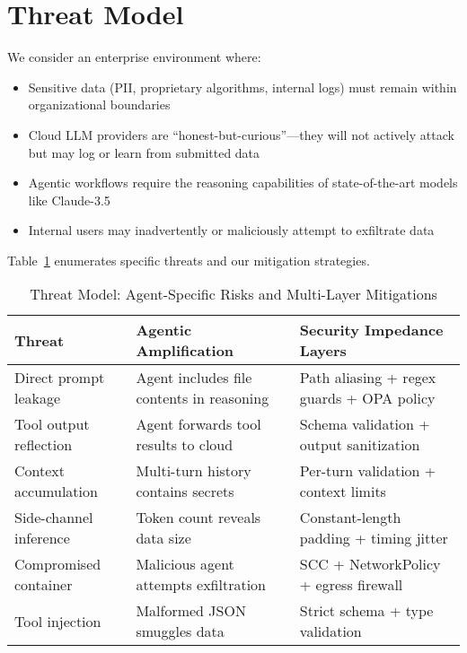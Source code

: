 \documentclass[11pt]{article}
\begin{document}
\section{Threat Model}

We consider an enterprise environment where:
\begin{itemize}
\item Sensitive data (PII, proprietary algorithms, internal logs) must remain within organizational boundaries
\item Cloud LLM providers are ``honest-but-curious''—they will not actively attack but may log or learn from submitted data
\item Agentic workflows require the reasoning capabilities of state-of-the-art models like Claude-3.5
\item Internal users may inadvertently or maliciously attempt to exfiltrate data
\end{itemize}

Table~\ref{tab:threats} enumerates specific threats and our mitigation strategies.

\begin{table}[htbp]
\centering
\caption{Threat Model: Agent-Specific Risks and Multi-Layer Mitigations}
\label{tab:threats}
\begin{tabular}{|l|p{3.5cm}|p{4.5cm}|}
\hline
\textbf{Threat} & \textbf{Agentic Amplification} & \textbf{Security Impedance Layers} \\
\hline
Direct prompt leakage & Agent includes file contents in reasoning & Path aliasing + regex guards + OPA policy \\
\hline
Tool output reflection & Agent forwards tool results to cloud & Schema validation + output sanitization \\
\hline
Context accumulation & Multi-turn history contains secrets & Per-turn validation + context limits \\
\hline
Side-channel inference & Token count reveals data size & Constant-length padding + timing jitter \\
\hline
Compromised container & Malicious agent attempts exfiltration & SCC + NetworkPolicy + egress firewall \\
\hline
Tool injection & Malformed JSON smuggles data & Strict schema + type validation \\
\hline
\end{tabular}
\end{table}
\end{document}
